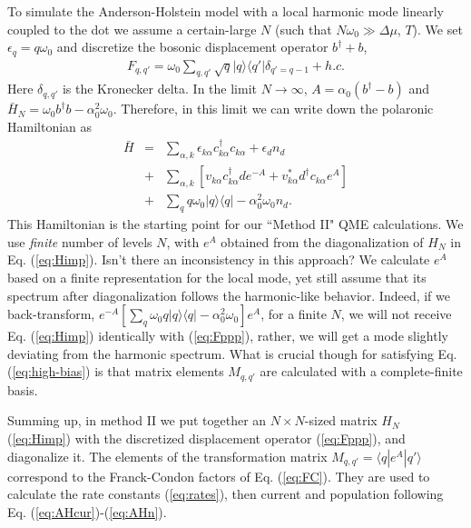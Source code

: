 \documentclass[aps,pra,twocolumn,groupedaddress,showpacs,superscriptaddress,amssymb,amsmath]{revtex4-1}
\newcommand{\bea}{\begin{eqnarray}}
\newcommand{\eea}{\end{eqnarray}}
\begin{document}
To simulate the Anderson-Holstein model with a local harmonic  mode linearly coupled to the dot
we assume a certain-large $N$ (such that $N\omega_0 \gg  \Delta\mu$, $T$). We
set $\epsilon_q=q\omega_0$ and
discretize the bosonic displacement operator $b^{\dagger}+b$,
%
\bea
F_{q,q'}=\omega_0\sum_{q,q'}\sqrt q|q\rangle \langle q'|\delta_{q'=q-1} +h.c.
\label{eq:Fppp}
\eea
%
Here $\delta_{q,q'}$ is the Kronecker delta. 
In the limit $N\rightarrow \infty$, 
$A=\alpha_0(b^{\dagger}-b)$ and $\bar H_{N}= \omega_0b^{\dagger}b-\alpha_0^2\omega_0$. %
Therefore, in this limit we can write down the polaronic Hamiltonian as 
%
\bea
\bar{H} %
&=&
\sum_{\alpha,k}\epsilon_{k\alpha} c_{k\alpha}^{\dagger}c_{k\alpha} +\epsilon_d  n_d
\nonumber\\
&+& \sum_{\alpha,k}\left[v_{k\alpha}c^{\dagger}_{k\alpha}de^{-A} +v_{k\alpha}^*d^{\dagger}c_{k\alpha}e^{A} \right]
\nonumber\\
&+&  \sum_{q}q\omega_0|q\rangle \langle q| - \alpha_0^2 \omega_0 n_d.
\label{eq:barHAH}
\eea
%
This Hamiltonian is the starting point for our ``Method II" QME calculations. 
We use {\it finite} number of levels $N$,
with $e^A$ obtained from the diagonalization of $H_N$ in Eq. (\ref{eq:Himp}).
Isn't there an inconsistency in this approach? We calculate $e^A$ based on a finite representation for the local mode, yet
 still assume that its spectrum after diagonalization follows the harmonic-like behavior.
%
Indeed, if we back-transform,
$e^{-A} \left[\sum_q \omega_0q |q\rangle \langle q| -\alpha_0^2\omega_0\right]e^{A}$, 
for a finite $N$, we will not receive Eq. (\ref{eq:Himp}) identically with (\ref{eq:Fppp}), rather, we will get
a mode slightly deviating from the harmonic spectrum.
What is crucial though for satisfying Eq. (\ref{eq:high-bias}) is that
matrix elements $M_{q,q'}$ are calculated with a complete-finite basis.
%

Summing up, in method II we put together an $N\times N$-sized matrix $H_N$ (\ref{eq:Himp}) with the discretized 
displacement operator (\ref{eq:Fppp}), and diagonalize it.
The elements of the transformation matrix $M_{q,q'}=\langle q|e^A|q'\rangle$
correspond to the Franck-Condon factors of Eq. (\ref{eq:FC}). 
They are used to calculate the rate constants (\ref{eq:rates}), then current and population
following Eq. (\ref{eq:AHcur})-(\ref{eq:AHn}).
\end{document}
